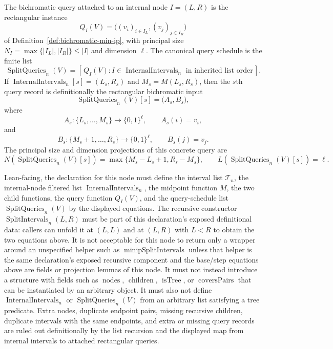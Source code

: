 \begin{definition}
  The bichromatic query attached to an internal node $I=(L,R)$ is the
  rectangular instance
  \[
    Q_I(V)=\bigl((v_i)_{i\in I_L},(v_j)_{j\in I_R}\bigr)
  \]
  of Definition~\ref{def:bichromatic-min-ip}, with principal size
  $N_I=\max\{|I_L|,|I_R|\}\leq |I|$ and dimension $\ell$.
  The canonical query schedule is the finite list
  \[
    \operatorname{SplitQueries}_n(V)
      =
      [\,Q_I(V): I\in\operatorname{InternalIntervals}_n
        \text{ in inherited list order}\,].
  \]
  If $\operatorname{InternalIntervals}_n[s]=(L_s,R_s)$ and
  $M_s=M(L_s,R_s)$, then the $s$th query record is definitionally the
  rectangular bichromatic input
  \[
    \operatorname{SplitQueries}_n(V)[s]
      =
      \bigl(A_s,B_s\bigr),
  \]
  where
  \[
    A_s:\{L_s,\ldots,M_s\}\to\{0,1\}^{\ell},\qquad A_s(i)=v_i,
  \]
  and
  \[
    B_s:\{M_s+1,\ldots,R_s\}\to\{0,1\}^{\ell},\qquad B_s(j)=v_j.
  \]
  The principal size and dimension projections of this concrete query are
  \[
    N(\operatorname{SplitQueries}_n(V)[s])
      =\max\{M_s-L_s+1,R_s-M_s\},
    \qquad
    L(\operatorname{SplitQueries}_n(V)[s])=\ell.
  \]

  Lean-facing, the declaration for this node must define the interval list
  $\mathcal T_n$, the internal-node filtered list
  $\operatorname{InternalIntervals}_n$, the midpoint function $M$, the two
  child functions, the query function $Q_I(V)$, and the query-schedule list
  $\operatorname{SplitQueries}_n(V)$ by the displayed equations.
  The recursive constructor
  $\operatorname{SplitIntervals}_n(L,R)$ must be part of this declaration's
  exposed definitional data: callers can unfold it at $(L,L)$ and at
  $(L,R)$ with $L<R$ to obtain the two equations above.  It is not acceptable
  for this node to return only a wrapper around an unspecified helper such as
  $\operatorname{minipSplitIntervals}$ unless that helper is the same
  declaration's exposed recursive component and the base/step equations above
  are fields or projection lemmas of this node.
  It must not instead introduce a structure with fields such as
  $\operatorname{nodes}$, $\operatorname{children}$, $\operatorname{isTree}$,
  or $\operatorname{coversPairs}$ that can be instantiated by an arbitrary
  object.  It must also not define
  $\operatorname{InternalIntervals}_n$ or $\operatorname{SplitQueries}_n(V)$
  from an arbitrary list satisfying a tree predicate.  Extra nodes, duplicate
  endpoint pairs, missing recursive children, duplicate intervals with the
  same endpoints, and extra or missing query records are ruled out
  definitionally by the list recursion and the displayed map from internal
  intervals to attached rectangular queries.
\end{definition}

